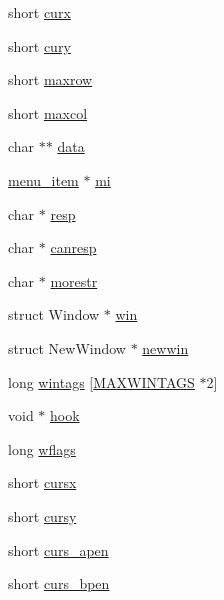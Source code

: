 \begin{DoxyCompactItemize}
\item 
short \hyperlink{structamii__WinDesc_a4ae862475cf0a2f6aed98394d3ac12bd}{curx}
\item 
short \hyperlink{structamii__WinDesc_aee07cf405ea0e78eb6b82c339360a0f8}{cury}
\item 
short \hyperlink{structamii__WinDesc_a1ca7af4b595bf7bb077ed78546548670}{maxrow}
\item 
short \hyperlink{structamii__WinDesc_a7abaf7568c45c6f6efabdfdc13164a4c}{maxcol}
\item 
char $\ast$$\ast$ \hyperlink{structamii__WinDesc_a1be96ba5842aef93cb36e73173277ad6}{data}
\item 
\hyperlink{wintype_8h_aaef709f77068fd7ba62812589327f08f}{menu\+\_\+item} $\ast$ \hyperlink{structamii__WinDesc_a9560c1afff5afb6c363fd74aa25283df}{mi}
\item 
char $\ast$ \hyperlink{structamii__WinDesc_a7c77cae36fa87a80e7c5b0cf9ed8284f}{resp}
\item 
char $\ast$ \hyperlink{structamii__WinDesc_ac8c4b6085649b349a4d36d38d3c4344d}{canresp}
\item 
char $\ast$ \hyperlink{structamii__WinDesc_a18f1ba88dadd6f00144ad9f0b16a2b20}{morestr}
\item 
struct Window $\ast$ \hyperlink{structamii__WinDesc_a9835faa4d66643cd889203e26edee8ae}{win}
\item 
struct New\+Window $\ast$ \hyperlink{structamii__WinDesc_a96e2d1e26527cec8fe44903009a365a8}{newwin}
\item 
long \hyperlink{structamii__WinDesc_a982df47148570e92162c13c1d158ef1b}{wintags} \mbox{[}\hyperlink{winami_8h_aeba1285219b573e495bbf2d14fc3ba2e}{M\+A\+X\+W\+I\+N\+T\+A\+G\+S} $\ast$2\mbox{]}
\item 
void $\ast$ \hyperlink{structamii__WinDesc_a95adbcba37257f02f7d9b3e5ef4c8411}{hook}
\item 
long \hyperlink{structamii__WinDesc_a4400afb6488c6a7b1f70f27ee0371963}{wflags}
\item 
short \hyperlink{structamii__WinDesc_ae9b81e1924a60034c9ca2f7dee3c97fd}{cursx}
\item 
short \hyperlink{structamii__WinDesc_a25574bc64eeaecb522e78f5c636da887}{cursy}
\item 
short \hyperlink{structamii__WinDesc_a101774acf6a2657276007d298c36609d}{curs\+\_\+apen}
\item 
short \hyperlink{structamii__WinDesc_a93ca00f32977372698256e74df4af3c4}{curs\+\_\+bpen}
\end{DoxyCompactItemize}



